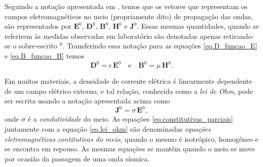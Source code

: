Seguindo a nota\c{c}\~ao apresentada em \cite{erigen_1963}, temos que os vetores que representam os campos eletromagn\'eticos no meio (propriamente dito) de propaga\c{c}\~ao das ondas, s\~ao representados por $\mathbf{E}^0$, $\mathbf{D}^0$, $\mathbf{B}^0$, $\mathbf{H}^0$ e
$\mathbf{J}^0$. Essas mesmas quantidades, quando se referirem \`as medidas observadas em laborat\'orio s\~ao denotadas apenas retirando-se o sobre-escrito $^0$. Transferindo essa nota\c{c}\~ao para as equa\c{c}\~oes \ref{eq.D_funcao_E} e \ref{eq.B_funcao_H} temos
\begin{equation}\label{eq.constitutivas_parciais}
\mathbf{D}^0=\epsilon\,\mathbf{E}^0\quad\text{e}\quad\mathbf{B}^0=\mu\,\mathbf{H}^0.
\end{equation}

Em muitos materiais, a densidade de corrente el\'etrica \'e linearmente dependente de um campo el\'etrico externo, e tal rela\c{c}\~ao, conhecida como a \textit{lei de Ohm}, pode ser escrita usando a nota\c{c}\~ao apresentada acima como
\begin{equation}\label{eq.lei_ohm}
\mathbf{J}^0=\sigma\,\mathbf{E}^0,
\end{equation}
onde $\sigma$ \'e a \textit{condutividade} do meio. As equa\c{c}\~oes \ref{eq.constitutivas_parciais} juntamente com a equa\c{c}\~ao \ref{eq.lei_ohm} s\~ao denominadas \textit{equa\c{c}\~oes eletromagn\'eticas contitutivas do meio}, quando o mesmo \'e isotr\'opico, homog\^eneo e se encontra em repouso. As mesmas equa\c{c}\~oes se mant\^em quando o meio se move por ocasi\~ao da passagem de uma onda s\'ismica. 

